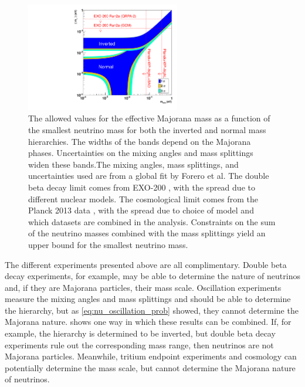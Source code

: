 \documentclass[herrin-thesis.tex]{subfiles}
\begin{document}
\begin{figure}[htp]
	\centering
	\includegraphics[width=0.6\textwidth]{./plots/nu_meff_v_mmin.pdf}
	\caption[Effective Majorana mass vs. smallest neutrino mass]{The allowed values for the effective Majorana mass as a function of the smallest neutrino mass for both the inverted and normal mass hierarchies. The widths of the bands depend on the Majorana phases. Uncertainties on the mixing angles and mass splittings widen these bands.The mixing angles, mass splittings, and uncertainties used are from a global fit by Forero et al. \cite{Forero:2012cr} The double beta decay limit comes from EXO-200 \cite{Auger:2012ar}, with the spread due to different nuclear models. The cosmological limit comes from the Planck 2013 data \cite{Ade:2013kl}, with the spread due to choice of model and which datasets are combined in the analysis. Constraints on the sum of the neutrino masses combined with the mass splittings yield an upper bound for the smallest neutrino mass.}
	\label{fig:nu_meff_v_mmin}
\end{figure}

The different experiments presented above are all complimentary. Double beta decay experiments, for example, may be able to determine the nature of neutrinos and, if they are Majorana particles, their mass scale. Oscillation experiments measure the mixing angles and mass splittings and should be able to determine the hierarchy, but as \cref{eq:nu_oscillation_prob} showed, they cannot determine the Majorana nature.  shows one way in which these results can be combined. If, for example, the hierarchy is determined to be inverted, but double beta decay experiments rule out the corresponding mass range, then neutrinos are not Majorana particles. Meanwhile, tritium endpoint experiments and cosmology can potentially determine the mass scale, but cannot determine the Majorana nature of neutrinos.
\end{document}

